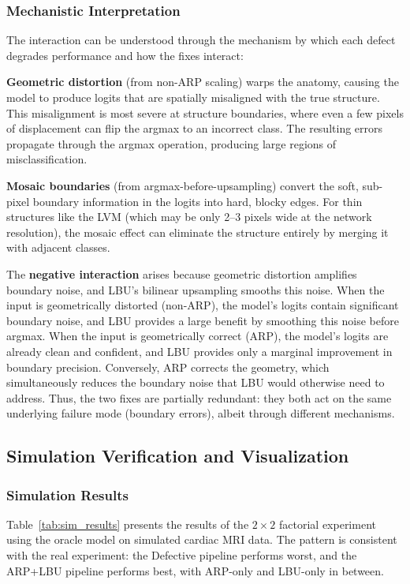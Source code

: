 \documentclass[10pt,twocolumn]{article}
\begin{document}
\subsubsection{Mechanistic Interpretation}

The interaction can be understood through the mechanism by which each defect degrades performance and how the fixes interact:

\textbf{Geometric distortion} (from non-ARP scaling) warps the anatomy, causing the model to produce logits that are spatially misaligned with the true structure.
This misalignment is most severe at structure boundaries, where even a few pixels of displacement can flip the argmax to an incorrect class.
The resulting errors propagate through the argmax operation, producing large regions of misclassification.

\textbf{Mosaic boundaries} (from argmax-before-upsampling) convert the soft, sub-pixel boundary information in the logits into hard, blocky edges.
For thin structures like the LVM (which may be only 2--3 pixels wide at the network resolution), the mosaic effect can eliminate the structure entirely by merging it with adjacent classes.

The \textbf{negative interaction} arises because geometric distortion amplifies boundary noise, and LBU's bilinear upsampling smooths this noise.
When the input is geometrically distorted (non-ARP), the model's logits contain significant boundary noise, and LBU provides a large benefit by smoothing this noise before argmax.
When the input is geometrically correct (ARP), the model's logits are already clean and confident, and LBU provides only a marginal improvement in boundary precision.
Conversely, ARP corrects the geometry, which simultaneously reduces the boundary noise that LBU would otherwise need to address.
Thus, the two fixes are partially redundant: they both act on the same underlying failure mode (boundary errors), albeit through different mechanisms.

\subsection{Simulation Verification and Visualization}
\label{sec:sim_exp}

\subsubsection{Simulation Results}

Table~\ref{tab:sim_results} presents the results of the $2\times2$ factorial experiment using the oracle model on simulated cardiac MRI data.
The pattern is consistent with the real experiment: the Defective pipeline performs worst, and the ARP+LBU pipeline performs best, with ARP-only and LBU-only in between.
\end{document}
